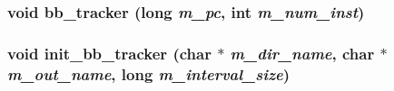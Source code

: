 \subsubsection[{bb\_\-tracker}]{\setlength{\rightskip}{0pt plus 5cm}void bb\_\-tracker (long {\em m\_\-pc}, \/  int {\em m\_\-num\_\-inst})}\label{bbtracker_8h_744f7ffd3071c0c33e003b3db5ac4973}


\subsubsection[{init\_\-bb\_\-tracker}]{\setlength{\rightskip}{0pt plus 5cm}void init\_\-bb\_\-tracker (char $\ast$ {\em m\_\-dir\_\-name}, \/  char $\ast$ {\em m\_\-out\_\-name}, \/  long {\em m\_\-interval\_\-size})}\label{bbtracker_8h_a8e2ed99fca4db294963b7b23d39230e}


